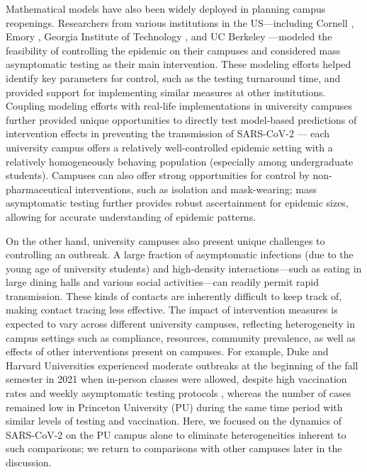 \documentclass[12pt]{article}
\begin{document}
Mathematical models have also been widely deployed in planning campus reopenings.
Researchers from various institutions in the US---including Cornell \citep{frazier2022modeling}, Emory \citep{lopman2020model}, Georgia Institute of Technology \citep{gibson2021surveillance}, and UC Berkeley \citep{brook2021optimizing}---modeled the feasibility of controlling the epidemic on their campuses and considered mass asymptomatic testing as their main intervention.
These modeling efforts helped identify key parameters for control, such as the testing turnaround time, and provided support for implementing similar measures at other institutions.
Coupling modeling efforts with real-life implementations in university campuses further provided unique opportunities to directly test model-based predictions of intervention effects in preventing the transmission of SARS-CoV-2 \citep{frazier2022modeling}---
each university campus offers a relatively well-controlled epidemic setting with a relatively homogeneously behaving population (especially among undergraduate students).
Campuses can also offer strong opportunities for control by non-pharmaceutical interventions, such as isolation and mask-wearing;
mass asymptomatic testing further provides robust ascertainment for epidemic sizes, allowing for accurate understanding of epidemic patterns.

On the other hand, university campuses also present unique challenges to controlling an outbreak.
A large fraction of asymptomatic infections (due to the young age of university students) and high-density interactions---such as eating in large dining halls and various social activities---can readily permit rapid transmission.
These kinds of contacts are inherently difficult to keep track of, making contact tracing less effective.
The impact of intervention measures is expected to vary across different university campuses, reflecting heterogeneity in campus settings such as compliance, resources, community prevalence, as well as effects of other interventions present on campuses.
For example, Duke and Harvard Universities experienced moderate outbreaks at the beginning of the fall semester in 2021 when in-person classes were allowed, despite high vaccination rates and weekly asymptomatic testing protocols \citep{dukeoutbreak,harvardoutbreak}, whereas the number of cases remained low in Princeton University (PU) during the same time period with similar levels of testing and vaccination.
Here, we focused on the dynamics of SARS-CoV-2 on the PU campus alone to eliminate heterogeneities inherent to such comparisons; we return to comparisons with other campuses later in the discussion.
\end{document}
